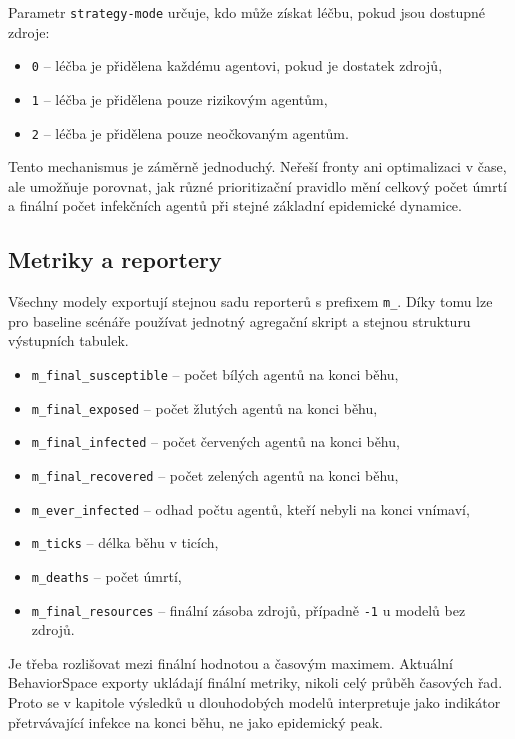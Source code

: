 \documentclass{article}
\begin{document}
Parametr \texttt{strategy-mode} určuje, kdo může získat léčbu, pokud jsou
dostupné zdroje:
\begin{itemize}
\item \texttt{0} -- léčba je přidělena každému agentovi, pokud je dostatek zdrojů,
\item \texttt{1} -- léčba je přidělena pouze rizikovým agentům,
\item \texttt{2} -- léčba je přidělena pouze neočkovaným agentům.
\end{itemize}

Tento mechanismus je záměrně jednoduchý. Neřeší fronty ani optimalizaci v čase,
ale umožňuje porovnat, jak různé prioritizační pravidlo mění celkový počet
úmrtí a finální počet infekčních agentů při stejné základní epidemické dynamice.

\subsection{Metriky a reportery}

Všechny modely exportují stejnou sadu reporterů s prefixem \texttt{m\_}. Díky
tomu lze pro baseline scénáře používat jednotný agregační skript a stejnou
strukturu výstupních tabulek.

\begin{itemize}
\item \texttt{m\_final\_susceptible} -- počet bílých agentů na konci běhu,
\item \texttt{m\_final\_exposed} -- počet žlutých agentů na konci běhu,
\item \texttt{m\_final\_infected} -- počet červených agentů na konci běhu,
\item \texttt{m\_final\_recovered} -- počet zelených agentů na konci běhu,
\item \texttt{m\_ever\_infected} -- odhad počtu agentů, kteří nebyli na konci vnímaví,
\item \texttt{m\_ticks} -- délka běhu v ticích,
\item \texttt{m\_deaths} -- počet úmrtí,
\item \texttt{m\_final\_resources} -- finální zásoba zdrojů, případně \texttt{-1}
u modelů bez zdrojů.
\end{itemize}

Je třeba rozlišovat mezi finální hodnotou a časovým maximem. Aktuální
BehaviorSpace exporty ukládají finální metriky, nikoli celý průběh časových
řad. Proto se v kapitole výsledků u dlouhodobých modelů interpretuje
 jako indikátor přetrvávající infekce na konci běhu,
ne jako epidemický peak.
\end{document}
